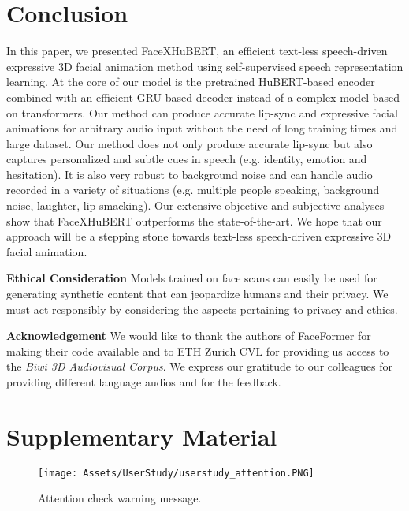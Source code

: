\documentclass[10pt,twocolumn,letterpaper]{article}
\begin{document}
\section{Conclusion}

In this paper, we presented FaceXHuBERT, an efficient text-less speech-driven expressive 3D facial animation method using self-supervised speech representation learning. At the core of our model is the pretrained HuBERT-based encoder combined with an efficient GRU-based decoder instead of a complex model based on transformers. Our method can produce accurate lip-sync and expressive facial animations for arbitrary audio input without the need of long training times and large dataset. Our method does not only produce accurate lip-sync but also captures personalized and subtle cues in speech (e.g. identity, emotion and hesitation). It is also very robust to background noise and can handle audio recorded in a variety of situations (e.g. multiple people speaking, background noise, laughter, lip-smacking). Our extensive objective and subjective analyses show that FaceXHuBERT outperforms the state-of-the-art. We hope that our approach will be a stepping stone towards text-less speech-driven expressive 3D facial animation.


\noindent\textbf{Ethical Consideration} Models trained on face scans can easily be used for generating synthetic content that can jeopardize humans and their privacy. We must act responsibly by considering the aspects pertaining to privacy and ethics.


\noindent\textbf{Acknowledgement} We would like to thank the authors of FaceFormer for making their code available and to ETH Zurich CVL for providing us access to the \textit{Biwi 3D Audiovisual Corpus}. We express our gratitude to our colleagues for providing different language audios and for the feedback.



{\small


}

\clearpage
\appendix
\section{Supplementary Material}

\begin{figure*}[]
  \centering
  \texttt{[image: Assets/UserStudy/userstudy\_attention.PNG]}
  \caption{Attention check warning message.}
  \label{fig:userstudyscreen3}
\end{figure*}
\end{document}
